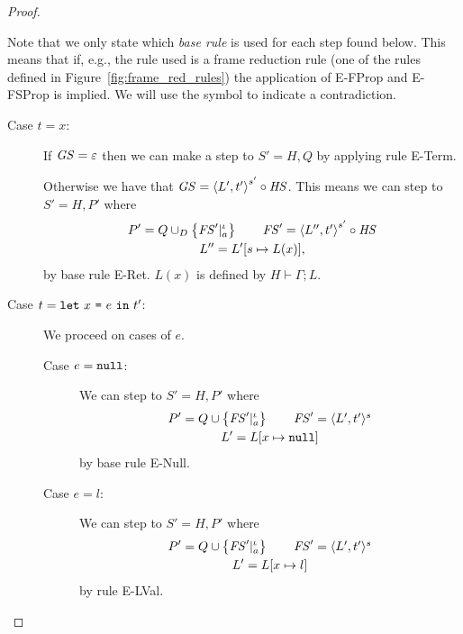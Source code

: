 \begin{proof}
  \begin{note}
    Note that we only state which \emph{base rule} is used for each step found below.
    This means that if, e.g., the rule used is a frame reduction rule (one of the
    rules defined in Figure~\ref{fig:frame_red_rules}) the application of {\sc
    E-FProp} and {\sc E-FSProp} is implied. We will use the symbol \lightning to
    indicate a contradiction.
  \end{note}

  \begin{description}
    \item[Case $t = x$:] 
      If $\mathit{GS} = \varepsilon$ then we can make a step to $S' = H, Q$ by applying
      rule {\sc E-Term}. \contradiction

      Otherwise we have that $\mathit{GS} = \mbox{$\langle L', t' \rangle$}^{s'} \circ \mathit{HS}$. This means we
      can step to $S' = H, P'$ where
      \begin{equation*}
        \begin{gathered}
          P' = Q \cup_D \left\{ \mathit{FS}'|_a^\iota \right\} \quad\quad \mathit{FS}' = \mbox{$\langle L'',
          t' \rangle$}^{s'} \circ \mathit{HS} \\ 
          L'' = L'[s \mapsto L(x)],
        \end{gathered} \end{equation*}
      by base rule {\sc E-Ret}. $L(x)$ is defined by $H \vdash \Gamma; L$. \contradiction
    
    \item[Case $t = \mbox{\mdseries\texttt{let}~$x$~\texttt{=}~$e$~\texttt{in}~$t'$}$:]
      We proceed on cases of $e$.
      \begin{description}
        \item[Case $e = \mbox{\mdseries\texttt{null}}$:] 
          We can step to $S' = H, P'$ where
          \begin{equation*}
            \begin{gathered}
              P' = Q \cup \left\{\mathit{FS}'|_a^\iota \right\} \quad\quad \mathit{FS}' = \mbox{$\langle L',
              t' \rangle^s$} \\
              L' = L[x \mapsto \mbox{\mdseries\texttt{null}}]
            \end{gathered}
          \end{equation*}
          by base rule {\sc E-Null}. \contradiction

        \item[Case $e = l$:]
          We can step to $S' = H, P'$ where 
          \begin{equation*}
            \begin{gathered}
              P' = Q \cup \left\{\mathit{FS}'|_a^\iota \right\} \quad\quad \mathit{FS}' = \mbox{$\langle L',
              t' \rangle^s$} \\
              L' = L[x \mapsto l]
            \end{gathered}
          \end{equation*}
          by rule {\sc E-LVal}. \contradiction


\end{description}
\end{description}
\end{proof}
